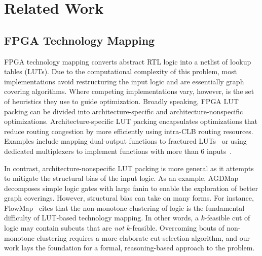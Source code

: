 \section{Related Work}\label{sec:relatedwork}
\subsection{FPGA Technology Mapping}\label{sec:relatedwork:fpga}
FPGA technology mapping converts abstract RTL logic into a netlist of lookup
tables (LUTs). Due to the computational complexity of this problem, most
implementations avoid restructuring the input logic and are essentially graph
covering algorithms. Where competing implementations vary, however, is the set
of heuristics they use to guide optimization. Broadly speaking, FPGA LUT
packing can be divided into architecture-specific and architecture-nonspecific
optimizations. Architecture-specific LUT packing encapsulates optimizations
that reduce routing congestion by more efficiently using intra-CLB routing
resources. Examples include mapping dual-output functions to fractured
LUTs~\cite{fraclut} or using dedicated multiplexers to implement functions with
more than 6 inputs~\cite{ug574}.

In contrast, architecture-nonspecific LUT packing is more general as it
attempts to mitigate the structural bias of the input logic. As an example,
AGDMap~\cite{adaptdecomp} decomposes simple logic gates with large fanin to
enable the exploration of better graph coverings. However, structural bias can
take on many forms. For instance, FlowMap~\cite{flowmap} cites that the
non-monotone clustering of logic is the fundamental difficulty of LUT-based
technology mapping. In other words, a $k$-feasible cut of logic may contain
subcuts that are \textit{not} $k$-feasible. Overcoming bouts of non-monotone
clustering requires a more elaborate cut-selection algorithm, and our work lays
the foundation for a formal, reasoning-based approach to the problem.

